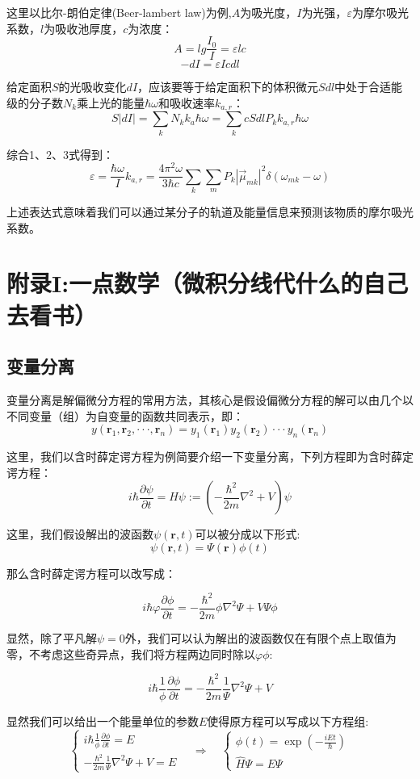这里以比尔-朗伯定律(Beer-lambert law)为例,$A$为吸光度，$I$为光强，$\varepsilon$为摩尔吸光系数，$l$为吸收池厚度，$c$为浓度：
\[A=lg \frac{I_0}{I}=\varepsilon lc \tag{1}\]
\[-dI=\varepsilon Icdl \tag{2}\]

给定面积$S$的光吸收变化$dI$，应该要等于给定面积下的体积微元$Sdl$中处于合适能级的分子数$N_k$乘上光的能量$\hbar \omega$和吸收速率$k_{a,r}$：
\[S|dI|=\sum_kN_kk_a\hbar \omega=\sum_kcSdlP_kk_{a,r}\hbar \omega \tag{3}\]

综合1、2、3式得到：
\[\varepsilon=\frac{\hbar \omega}{I}k_{a,r}=\frac{4\pi^2 \omega}{3 \hbar c}\sum_k\sum_m P_k |\overrightarrow{\mu}_{mk}|^2 \delta(\omega_{mk}-\omega)\]

上述表达式意味着我们可以通过某分子的轨道及能量信息来预测该物质的摩尔吸光系数。

\section{附录I:一点数学（微积分线代什么的自己去看书）}
\subsection{变量分离}
变量分离是解偏微分方程的常用方法，其核心是假设偏微分方程的解可以由几个以不同变量（组）为自变量的函数共同表示，即：
\[y(\bm{r}_1,\bm{r}_2,\cdot\cdot\cdot,\bm{r}_n)=y_1(\bm{r}_1)y_2(\bm{r}_2)\cdot\cdot\cdot y_n(\bm{r}_n)\]

这里，我们以含时薛定谔方程为例简要介绍一下变量分离，下列方程即为含时薛定谔方程：
\[i \hbar \frac{\partial \psi}{\partial t} =\hat{H}\psi:=\left (-\frac{\hbar^2}{2m}\nabla^2+V \right ) \psi\]

这里，我们假设解出的波函数$\psi(\bm{r},t)$可以被分成以下形式:
\[\psi(\bm{r},t)=\varPsi(\bm{r})\phi(t)\]

那么含时薛定谔方程可以改写成：

\[i \hbar \varphi \frac{\partial \phi}{\partial t}= -\frac{\hbar^2}{2m} \phi \nabla^2 \varPsi+V\varPsi\phi\]

显然，除了平凡解$\psi=0$外，我们可以认为解出的波函数仅在有限个点上取值为零，不考虑这些奇异点，我们将方程两边同时除以$\varphi$$\phi$:

\[i \hbar \frac{1}{\phi} \frac{\partial \phi}{\partial t}= -\frac{\hbar^2}{2m} \frac{1}{\varPsi} \nabla^2 \varPsi+V\]

显然我们可以给出一个能量单位的参数$E$使得原方程可以写成以下方程组:
\[\left\{
\begin{array}{r}
i\hbar\frac{1}{\phi}\frac{\partial\phi}{\partial t}=E\\
-\frac{\hbar^2}{2m}\frac{1}{\varPsi}\nabla^2\varPsi+V=E
\end{array} \right. \quad \Rightarrow \quad
\left\{
\begin{array}{l}
\phi(t)=\exp(-\frac{iEt}{\hbar})\\
\hat{H}\varPsi=E\varPsi
\end{array} \right.\]


